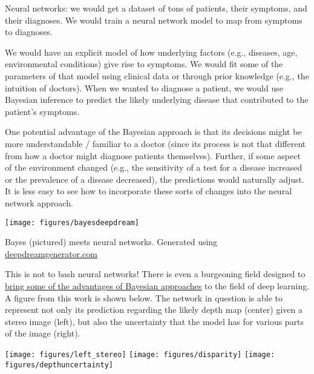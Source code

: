 \documentclass[assignment01_Solutions]{subfiles}
\begin{document}
\bi
\item Neural networks: we would get a dataset of tons of patients, their symptoms, and their diagnoses.  We would train a neural network model to map from symptoms to diagnoses.
\item We would have an explicit model of how underlying factors (e.g., diseases, age, environmental conditions) give rise to symptoms.  We would fit some of the parameters of that model using clinical data or through prior knowledge (e.g., the intuition of doctors).  When we wanted to diagnose a patient, we would use Bayesian inference to predict the likely underlying disease that contributed to the patient's symptoms.
\ei
 
One potential advantage of the Bayesian approach is that its decisions might be more understandable / familiar to a doctor (since its process is not that different from how a doctor might diagnose patients themselves).  Further, if some aspect of the environment changed (e.g., the sensitivity of a test for a disease increased or the prevalence of a disease decreased), the predictions would naturally adjust.  It is less easy to see how to incorporate these sorts of changes into the neural network approach.
 
 \begin{marginfigure}
 \texttt{[image: figures/bayesdeepdream]}
 \caption{Bayes (pictured) meets neural networks.  Generated using \href{https://deepdreamgenerator.com}{deepdreamgenerator.com}}
 \end{marginfigure}
 This is not to bash neural networks!  There is even a burgeoning field designed to \href{https://alexgkendall.com/computer_vision/bayesian_deep_learning_for_safe_ai/}{bring some of the advantages of Bayesian approaches} to the field of deep learning.  A figure from this work is shown below.  The network in question is able to represent not only its prediction regarding the likely depth map (center) given a stereo image (left), but also the uncertainty that the model has for various parts of the image (right).
 
 \begin{center}
  \texttt{[image: figures/left\_stereo]}
    \texttt{[image: figures/disparity]}
 \texttt{[image: figures/depthuncertainty]}
 \end{center}
\end{document}
